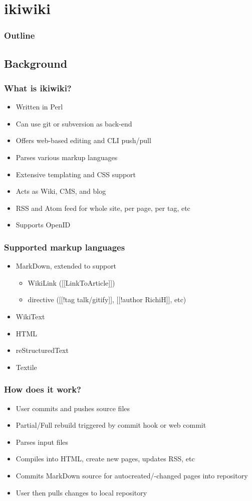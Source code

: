 \documentclass[t]{beamer}
\begin{document}
\section{ikiwiki}

\begin{frame}
	\frametitle{Outline}
	\tableofcontents[currentsection]
\end{frame}

\subsection{Background}

\begin{frame}
	\frametitle{What is ikiwiki?}
	\begin{itemize}
		\item Written in Perl
		\item Can use git or subversion as back-end
		\item Offers web-based editing and CLI push/pull
		\item Parses various markup languages
		\item Extensive templating and CSS support
		\item Acts as Wiki, CMS, and blog
		\item RSS and Atom feed for whole site, per page, per tag, etc
		\item Supports OpenID
	\end{itemize}
\end{frame}

\begin{frame}
	\frametitle{Supported markup languages}
	\begin{itemize}
		\item MarkDown, extended to support
		\begin{itemize}
			\item WikiLink ([[LinkToArticle]])
			\item directive ([[!tag talk/gitify]], [[!author RichiH]], etc)
		\end{itemize}
		\item WikiText
		\item HTML
		\item reStructuredText
		\item Textile
	\end{itemize}
\end{frame}

\begin{frame}
	\frametitle{How does it work?}
	\begin{itemize}
		\item User commits and pushes source files
		\item Partial/Full rebuild triggered by commit hook or web commit
		\item Parses input files
		\item Compiles into HTML, create new pages, updates RSS, etc
		\item Commits MarkDown source for autocreated/-changed pages into repository
		\item User then pulls changes to local repository
	\end{itemize}
\end{frame}
\end{document}
